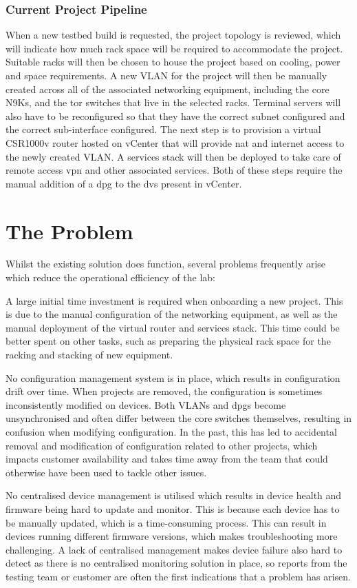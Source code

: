 \subsubsection{Current Project Pipeline}
When a new testbed build is
requested, the project topology is reviewed, which will indicate how much
rack space will be required to accommodate the project. Suitable racks will then
be chosen to house the project based on cooling, power and space requirements.
A new VLAN for the project will then be manually created across all of the
associated networking equipment, including the core N9Ks, and the \gls{tor}
switches that live in the selected racks. Terminal servers will also have to be
reconfigured so that they have the correct subnet configured and the correct
sub-interface configured. The next step is to provision a virtual CSR1000v
router hosted on vCenter that will provide \gls{nat} and internet access to the
newly created VLAN. A services stack will then be deployed to take care of
remote access \gls{vpn} and other associated services. Both of these steps
require the manual addition of a \gls{dpg} to the \gls{dvs} present in vCenter.
\section{The Problem}
\label{intro:problem}
Whilst the existing solution does
function, several problems frequently arise which reduce the operational
efficiency of the lab:

A large initial time investment is required when
onboarding a new project. This is due to the manual configuration of the
networking equipment, as well as the manual deployment of the virtual router
and services stack. This time could be better spent on other tasks, such as
preparing the physical rack space for the racking and stacking of new equipment.

No configuration management system is in place, which results in configuration
drift over time. When projects are removed, the configuration is sometimes
inconsistently modified on devices. Both VLANs and \gls{dpg}s become
unsynchronised and often differ between the core switches themselves, resulting
in confusion when modifying configuration. In the past, this has led to
accidental removal and modification of configuration related to other projects,
which impacts customer availability and takes time away from the team that
could otherwise have been used to tackle other issues.

No centralised device
management is utilised which results in device health and firmware being hard to update and monitor.
This is because each device has to be manually updated, which is a
time-consuming process. This can result in devices running different firmware versions, which makes troubleshooting more challenging. A
lack of centralised management makes device failure also hard to detect as there is no
centralised monitoring solution in place, so reports from the testing team or
customer are often the first indications that a problem has arisen.

